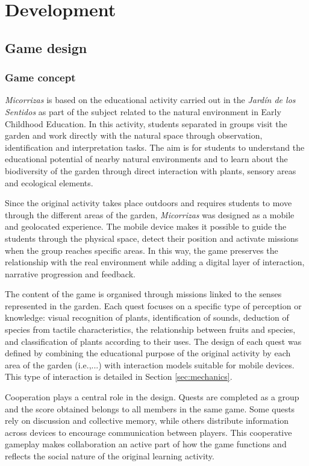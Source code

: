 \chapter{Development}

\section{Game design}

\subsection{Game concept}
\textit{Micorrizas} is based on the educational activity carried out in the \textit{Jardín de los Sentidos} as part of the subject related to the natural environment in Early Childhood Education. In this activity, students separated in groups visit the garden and work directly with the natural space through observation, identification and interpretation tasks. The aim is for students to understand the educational potential of nearby natural environments and to learn about the biodiversity of the garden through direct interaction with plants, sensory areas and ecological elements.

Since the original activity takes place outdoors and requires students to move through the different areas of the garden, \textit{Micorrizas} was designed as a mobile and geolocated experience. The mobile device makes it possible to guide the students through the physical space, detect their position and activate missions when the group reaches specific areas. In this way, the game preserves the relationship with the real environment while adding a digital layer of interaction, narrative progression and feedback.

The content of the game is organised through missions linked to the senses represented in the garden. Each quest focuses on a specific type of perception or knowledge: visual recognition of plants, identification of sounds, deduction of species from tactile characteristics, the relationship between fruits and species, and classification of plants according to their uses. The design of each quest was defined by combining the educational purpose of the original activity by each area of the garden (i.e.,...) with interaction models suitable for mobile devices. This type of interaction is detailed in Section \ref{sec:mechanics}.

Cooperation plays a central role in the design. Quests are completed as a group and the score obtained belongs to all members in the same game. Some quests rely on discussion and collective memory, while others distribute information across devices to encourage communication between players. This cooperative gameplay makes collaboration an active part of how the game functions and reflects the social nature of the original learning activity.

